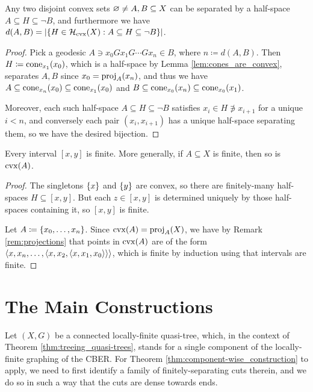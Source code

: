 \documentclass[reqno]{amsart}
\begin{document}
    \begin{lemma}\label{lem:half_space_separating_convex}
        Any two disjoint convex sets $\em\neq A,B\subseteq X$ can be separated by a half-space $A\subseteq H\subseteq\lnot B$, and furthermore we have $d(A,B)=|\!\l\{H\in\mc{H}_\mathrm{cvx}(X)\st A\subseteq H\subseteq\lnot B\r\}\!|$.
    \end{lemma}
    \begin{proof}
        Pick a geodesic $A\ni x_0Gx_1G\cdots Gx_n\in B$, where $n\coloneqq d(A,B)$. Then $H\coloneqq\cone_{x_1}(x_0)$, which is a half-space by Lemma \ref{lem:cones_are_convex}, separates $A,B$ since $x_0=\proj_A(x_n)$, and thus we have $A\subseteq\cone_{x_n}(x_0)\subseteq\cone_{x_1}(x_0)$ and $B\subseteq\cone_{x_0}(x_n)\subseteq\cone_{x_0}(x_1)$.

        Moreover, each such half-space $A\subseteq H\subseteq\lnot B$ satisfies $x_i\in H\not\ni x_{i+1}$ for a unique $i<n$, and conversely each pair $(x_i,x_{i+1})$ has a unique half-space separating them, so we have the desired bijection.
    \end{proof}

    \begin{lemma}\label{lem:convex_of_finite_is_finite}
        Every interval $[x,y]$ is finite. More generally, if $A\subseteq X$ is finite, then so is $\cvx(A)$.
    \end{lemma}
    \begin{proof}
        The singletons $\l\{x\r\}$ and $\l\{y\r\}$ are convex, so there are finitely-many half-spaces $H\subseteq[x,y]$. But each $z\in[x,y]$ is determined uniquely by those half-spaces containing it, so $[x,y]$ is finite.

        Let $A\coloneqq\l\{x_0,\dots,x_n\r\}$. Since $\cvx(A)=\proj_A(X)$, we have by Remark \ref{rem:projections} that points in $\cvx(A)$ are of the form $\l\langle x,x_n,\dots,\l\langle x,x_2,\l\langle x,x_1,x_0\r\rangle\r\rangle\r\rangle$, which is finite by induction using that intervals are finite.
    \end{proof}

    \section{The Main Constructions}

    Let $(X,G)$ be a connected locally-finite quasi-tree, which, in the context of Theorem \ref{thm:treeing_quasi-trees}, stands for a single component of the locally-finite graphing of the CBER. For Theorem \ref{thm:component-wise_construction} to apply, we need to first identify a family of finitely-separating cuts therein, and we do so in such a way that the cuts are dense towards ends.
\end{document}
